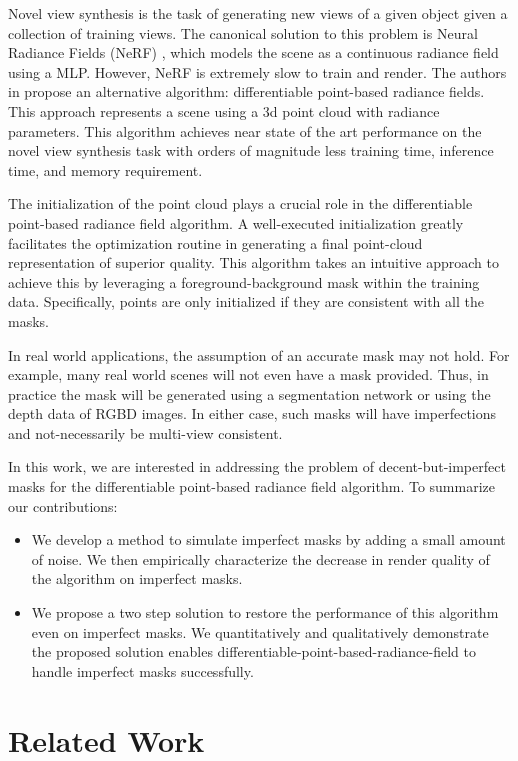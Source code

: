 \documentclass[10pt,twocolumn,letterpaper]{article}
\begin{document}
Novel view synthesis is the task of generating new views of a given object given a collection of training views. The canonical solution to this problem is Neural Radiance Fields (NeRF) \cite{mildenhall2020nerf}, which models the scene as a continuous radiance field using a MLP. However, NeRF is extremely slow to train and render. The authors in \cite{zhang2022differentiable} propose an alternative algorithm: differentiable point-based radiance fields. This approach represents a scene using a 3d point cloud with radiance parameters. This algorithm achieves near state of the art performance on the novel view synthesis task with orders of magnitude less training time, inference time, and memory requirement.

The initialization of the point cloud plays a crucial role in the differentiable point-based radiance field algorithm. A well-executed initialization greatly facilitates the optimization routine in generating a final point-cloud representation of superior quality. This algorithm takes an intuitive approach to achieve this by leveraging a foreground-background mask within the training data. Specifically, points are only initialized if they are consistent with all the masks.

In real world applications, the assumption of an accurate mask may not hold. For example, many real world scenes will not even have a mask provided. Thus, in practice the mask will be generated using a segmentation network or using the depth data of RGBD images. In either case, such masks will have imperfections and not-necessarily be multi-view consistent.

In this work, we are interested in addressing the problem of decent-but-imperfect masks for the differentiable point-based radiance field algorithm. To summarize our contributions:

\begin{itemize}
    \item We develop a method to simulate imperfect masks by adding a small amount of noise. We then empirically characterize the decrease in render quality of the algorithm on imperfect masks.
    \item We propose a two step solution to restore the performance of this algorithm even on imperfect masks. We quantitatively and qualitatively demonstrate the proposed solution enables differentiable-point-based-radiance-field to handle imperfect masks successfully.
\end{itemize}

\section{Related Work}
\end{document}
